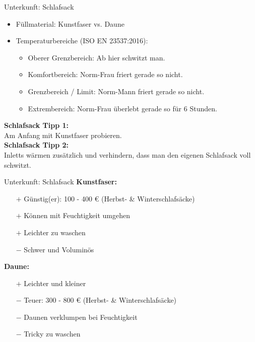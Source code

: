 \documentclass{beamer}
\newcommand{\tipp}[2][Tipp]{\vspace{0.2cm}\textbf{#1:}\\#2}
\begin{document}
			\begin{frame}{Unterkunft: Schlafsack}
				\begin{itemize}
					\item Füllmaterial: Kunstfaser vs. Daune
					\item Temperaturbereiche (ISO EN 23537:2016):
					\begin{itemize}
						\item Oberer Grenzbereich: Ab hier schwitzt man.
						\item Komfortbereich: Norm-Frau friert gerade so nicht.
						\item Grenzbereich / Limit: Norm-Mann friert gerade so nicht.
						\item Extrembereich: Norm-Frau überlebt gerade so für 6 Stunden.
					\end{itemize}
				\end{itemize}
				\tipp[Schlafsack Tipp 1]{Am Anfang mit Kunstfaser probieren.}\\\pause
				\tipp[Schlafsack Tipp 2]{Inletts wärmen zusätzlich und verhindern, dass man den eigenen Schlafsack voll schwitzt.}
			\end{frame}
			
			\begin{frame}{Unterkunft: Schlafsack}
				\textbf{Kunstfaser:}
				\begin{itemize}
					\item[$+$] Günstig(er): 100 - 400 € (Herbst- \& Winterschlafsäcke)
					\item[$+$] Können mit Feuchtigkeit umgehen
					\item[$+$] Leichter zu waschen
					\item[$-$] Schwer und Voluminös
				\end{itemize}\pause
				\textbf{Daune:}
				\begin{itemize}
					\item[$+$] Leichter und kleiner
					\item[$-$] Teuer: 300 - 800 € (Herbst- \& Winterschlafsäcke)
					\item[$-$] Daunen verklumpen bei Feuchtigkeit
					\item[$-$] Tricky zu waschen
				\end{itemize}
			\end{frame}
			
			
\end{document}
